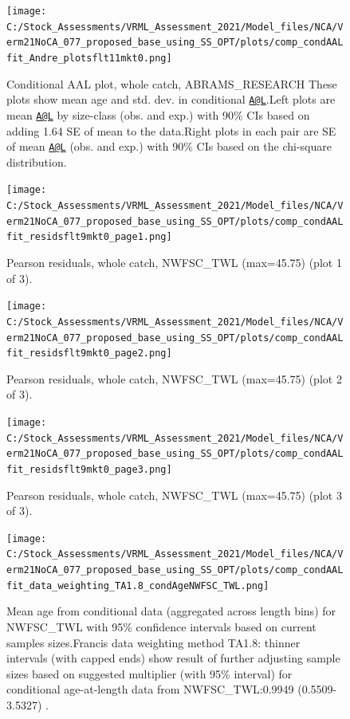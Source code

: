 \documentclass[
  english,
  a4paper,
]{article}
\begin{document}
\begin{figure}
\centering
\texttt{[image: C:/Stock\_Assessments/VRML\_Assessment\_2021/Model\_files/NCA/Verm21NoCA\_077\_proposed\_base\_using\_SS\_OPT/plots/comp\_condAALfit\_Andre\_plotsflt11mkt0.png]}
\caption{Conditional AAL plot, whole catch, ABRAMS\_RESEARCH
These plots show mean age and std. dev. in conditional \href{mailto:A@L}{\nolinkurl{A@L}}.Left plots are mean \href{mailto:A@L}{\nolinkurl{A@L}} by size-class (obs. and exp.) with 90\% CIs based on adding 1.64 SE of mean to the data.Right plots in each pair are SE of mean \href{mailto:A@L}{\nolinkurl{A@L}} (obs. and exp.) with 90\% CIs based on the chi-square distribution.\label{fig:comp_condAALfit_Andre_plotsflt11mkt0}}
\end{figure}

\begin{figure}
\centering
\texttt{[image: C:/Stock\_Assessments/VRML\_Assessment\_2021/Model\_files/NCA/Verm21NoCA\_077\_proposed\_base\_using\_SS\_OPT/plots/comp\_condAALfit\_residsflt9mkt0\_page1.png]}
\caption{Pearson residuals, whole catch, NWFSC\_TWL (max=45.75) (plot 1 of 3).\label{fig:comp_condAALfit_residsflt9mkt0_page1}}
\end{figure}

\begin{figure}
\centering
\texttt{[image: C:/Stock\_Assessments/VRML\_Assessment\_2021/Model\_files/NCA/Verm21NoCA\_077\_proposed\_base\_using\_SS\_OPT/plots/comp\_condAALfit\_residsflt9mkt0\_page2.png]}
\caption{Pearson residuals, whole catch, NWFSC\_TWL (max=45.75) (plot 2 of 3).\label{fig:comp_condAALfit_residsflt9mkt0_page2}}
\end{figure}

\begin{figure}
\centering
\texttt{[image: C:/Stock\_Assessments/VRML\_Assessment\_2021/Model\_files/NCA/Verm21NoCA\_077\_proposed\_base\_using\_SS\_OPT/plots/comp\_condAALfit\_residsflt9mkt0\_page3.png]}
\caption{Pearson residuals, whole catch, NWFSC\_TWL (max=45.75) (plot 3 of 3).\label{fig:comp_condAALfit_residsflt9mkt0_page3}}
\end{figure}

\begin{figure}
\centering
\texttt{[image: C:/Stock\_Assessments/VRML\_Assessment\_2021/Model\_files/NCA/Verm21NoCA\_077\_proposed\_base\_using\_SS\_OPT/plots/comp\_condAALfit\_data\_weighting\_TA1.8\_condAgeNWFSC\_TWL.png]}
\caption{Mean age from conditional data (aggregated across length bins) for NWFSC\_TWL with 95\% confidence intervals based on current samples sizes.Francis data weighting method TA1.8: thinner intervals (with capped ends) show result of further adjusting sample sizes based on suggested multiplier (with 95\% interval) for conditional age-at-length data from NWFSC\_TWL:0.9949 (0.5509-3.5327) .\label{fig:comp_condAALfit_data_weighting_TA1.8_condAgeNWFSC_TWL}}
\end{figure}
\end{document}
